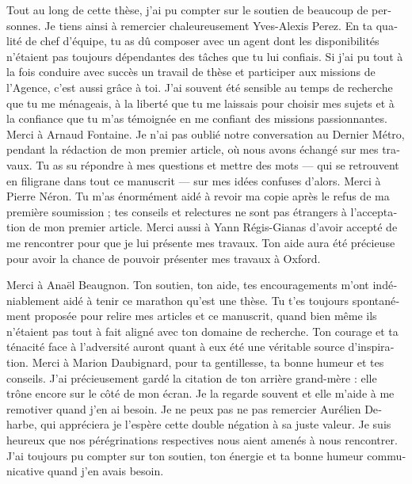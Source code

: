 \begin{otherlanguage}{french}
  Tout au long de cette thèse, j’ai pu compter sur le soutien de beaucoup de
  personnes. Je tiens ainsi à remercier chaleureusement Yves-Alexis Perez. En ta
  qualité de chef d’équipe, tu as dû composer avec un agent dont les
  disponibilités n’étaient pas toujours dépendantes des tâches que tu lui
  confiais. Si j’ai pu tout à la fois conduire avec succès un travail de thèse
  et participer aux missions de l’Agence, c’est aussi grâce à toi. J’ai souvent
  été sensible au temps de recherche que tu me ménageais, à la liberté que tu me
  laissais pour choisir mes sujets et à la confiance que tu m’as témoignée en me
  confiant des missions passionnantes.
  Merci à Arnaud Fontaine. Je n’ai pas oublié notre conversation au Dernier
  Métro, pendant la rédaction de mon premier article, où nous avons échangé sur
  mes travaux. Tu as su répondre à mes questions et mettre des mots --- qui se
  retrouvent en filigrane dans tout ce manuscrit --- sur mes idées confuses
  d’alors.
  Merci à Pierre Néron. Tu m’as énormément aidé à revoir ma copie après le refus
  de ma première soumission ; tes conseils et relectures ne sont pas étrangers à
  l’acceptation de mon premier article.
  Merci aussi à Yann Régis-Gianas d’avoir accepté de me rencontrer pour que je
  lui présente mes travaux. Ton aide aura été précieuse pour avoir la chance de
  pouvoir présenter mes travaux à Oxford.

  Merci à Anaël Beaugnon. Ton soutien, ton aide, tes encouragements m’ont
  indéniablement aidé à tenir ce marathon qu'est une thèse. Tu t’es toujours
  spontanément proposée pour relire mes articles et ce manuscrit, quand bien
  même ils n’étaient pas tout à fait aligné avec ton domaine de recherche. Ton
  courage et ta ténacité face à l’adversité auront quant à eux été une véritable
  source d’inspiration.
  Merci à Marion Daubignard, pour ta gentillesse, ta bonne humeur et tes
  conseils. J’ai précieusement gardé la citation de ton arrière grand-mère :
  elle trône encore sur le côté de mon écran. Je la regarde souvent et elle
  m’aide à me remotiver quand j’en ai besoin.
  Je ne peux pas ne pas remercier Aurélien Deharbe, qui appréciera je l’espère
  cette double négation à sa juste valeur. Je suis heureux que nos
  pérégrinations respectives nous aient amenés à nous rencontrer. J’ai toujours
  pu compter sur ton soutien, ton énergie et ta bonne humeur communicative quand
  j’en avais besoin.


\end{otherlanguage}

